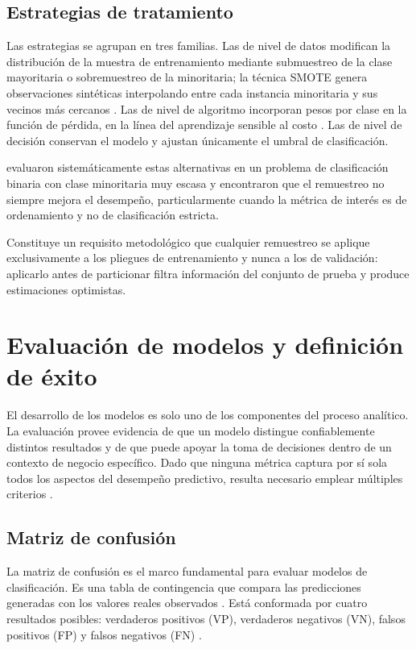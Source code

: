 \subsection{Estrategias de tratamiento}

Las estrategias se agrupan en tres familias. Las de nivel de datos
modifican la distribución de la muestra de entrenamiento mediante submuestreo de la
clase mayoritaria o sobremuestreo de la minoritaria; la técnica SMOTE genera
observaciones sintéticas interpolando entre cada instancia minoritaria y sus
vecinos más cercanos \cite{chawla2002smote}. Las de nivel de algoritmo
incorporan pesos por clase en la función de pérdida, en la línea del aprendizaje
sensible al costo \cite{elkan2001foundations, ling2010cost}. Las de nivel
de decisión conservan el modelo y ajustan únicamente el umbral de clasificación.

 evaluaron sistemáticamente estas alternativas en un
problema de clasificación binaria con clase minoritaria muy escasa y encontraron
que el remuestreo no siempre mejora el desempeño, particularmente cuando la
métrica de interés es de ordenamiento y no de clasificación estricta.

Constituye un requisito metodológico que cualquier remuestreo se aplique
exclusivamente a los pliegues de entrenamiento y nunca a los de validación:
aplicarlo antes de particionar filtra información del conjunto de prueba y produce
estimaciones optimistas.

\section{Evaluación de modelos y definición de éxito}

El desarrollo de los modelos es solo uno de los componentes del proceso analítico.
La evaluación provee evidencia de que un modelo distingue confiablemente distintos
resultados y de que puede apoyar la toma de decisiones dentro de un contexto de
negocio específico. Dado que ninguna métrica captura por sí sola todos los aspectos
del desempeño predictivo, resulta necesario emplear múltiples criterios
\cite{provost2013data, abbott2015defining}.

\subsection{Matriz de confusión}

La matriz de confusión es el marco fundamental para evaluar modelos de
clasificación. Es una tabla de contingencia que compara las predicciones generadas
con los valores reales observados \cite{han2011data}. Está conformada por cuatro
resultados posibles: verdaderos positivos (VP), verdaderos negativos (VN), falsos
positivos (FP) y falsos negativos (FN) \cite{provost2013data}.

